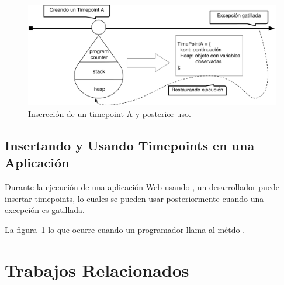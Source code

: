 \documentclass[conference]{IEEEtran}
\begin{document}
\begin{figure}[t]
\begin{center}
\includegraphics[width=.95\linewidth]{fig-timePointA}
\caption{Insercci\'on de un timepoint A y posterior uso.}
\label{fig:tpA}
\end{center}
\end{figure}


\subsection{Insertando y Usando Timepoints en una Aplicaci\'on}
\label{sec:utime}

Durante la ejecuci\'on de una aplicaci\'on Web usando \deloreanjs, un desarrollador puede insertar timepoints, lo cuales se pueden usar posteriormente cuando una excepci\'on es gatillada.  

 La figura~\ref{fig:tpA} lo que ocurre cuando un programador llama al m\'etdo .  
     

%
%	
%	
%

	

\here

\section{Trabajos Relacionados}
\label{sec:rw}
\end{document}
